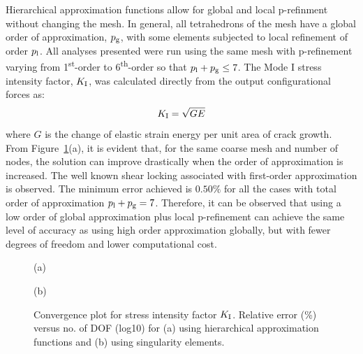 \documentclass[onecolumn]{svjour3}
\begin{document}
Hierarchical approximation functions allow for global and local p-refinment without changing the mesh.
In general, all tetrahedrons of the mesh have a global order of approximation, $p_{\rm g}$, with some elements subjected to local refinement of order $p_{\rm{l}}$.
All analyses presented were run using the same mesh with p-refinement varying from 1\textsuperscript{st}-order to 6\textsuperscript{th}-order so that $p_{\rm l} + p_{\rm g} \leq 7$.
The Mode I stress intensity factor, $K_{\rm I}$, was calculated directly from the output configurational forces as: 
\begin{equation}
K_{\rm I} = \sqrt{GE}
\end{equation}
where $G$ is the change of elastic strain energy per unit area of crack growth.
From Figure~\ref{fig:plate_conv}(a), it is evident that, for the same coarse mesh and number of nodes, the solution can improve drastically when the order of approximation is increased. 
The well known shear locking associated with first-order approximation is observed. 
The minimum error achieved is $0.50\%$ for all the cases with total order of approximation  $p_{\rm l} + p_{\rm g} = 7$. 
Therefore, it can be observed that using a low order of global approximation plus local p-refinement 
can achieve the same level of accuracy as using high order approximation globally, but with fewer degrees of freedom and lower computational cost.
\begin{figure}[h]
	\centering

	
	\begin{minipage}{.45\textwidth}
		\begin{centering} (a) \end{centering}
	\end{minipage}%
	\begin{minipage}{.45\textwidth}
\begin{centering} (b) \end{centering}
	\end{minipage}
	\caption{Convergence plot for stress intensity factor $K_{\rm I}$. Relative error (\%) versus no. of DOF (log10) for (a) using hierarchical approximation functions and (b) using singularity elements.}
			\label{fig:plate_conv}
\end{figure}
\end{document}
